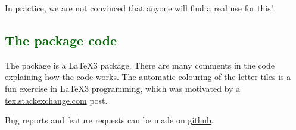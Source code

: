 \documentclass[svgnames]{report}
\newcommand\Section[1]{\subsection{\textcolor{DarkGreen}{#1}}}
\begin{document}
  In practice, we are not convinced that anyone will find a real use for this!

  \Section{The package code}

  The  package is a \LaTeX3 package. There are many
  comments in the code explaining how the code works. The automatic
  colouring of the letter tiles is a fun exercise in \LaTeX3
  programming, which was motivated by a
  \href{https://tex.stackexchange.com/questions/659860/wordle-like-colored-letter-boxes-in-latex/660056#660056}{tex.stackexchange.com} post.

  Bug reports and feature requests can be made on \href{https://github.com/AndrewMathas/Wordle}{github}.

  \printindex
\end{document}
